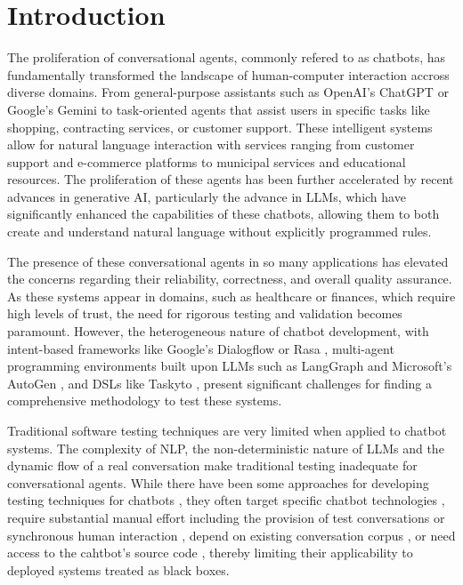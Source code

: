 
\chapter{Introduction}\label{chapter:introduction}


The proliferation of conversational agents, commonly refered to as chatbots, has fundamentally transformed the landscape of human-computer interaction accross diverse domains.
From general-purpose assistants such as OpenAI's ChatGPT \autocite{ChatGPT} or Google's Gemini \autocite{GoogleGemini}
to task-oriented agents that assist users in specific tasks like shopping, contracting services, or customer support.
These intelligent systems allow for natural language interaction with services ranging from customer support and e-commerce platforms to municipal services and educational resources.
The proliferation of these agents has been further accelerated by recent advances in generative \ac{AI},
particularly the advance in \acp{LLM},
which have significantly enhanced the capabilities of these chatbots, allowing them to both create and understand natural language without explicitly programmed rules.

The presence of these conversational agents in so many applications has elevated the concerns regarding their reliability, correctness, and overall quality assurance.
As these systems appear in domains, such as healthcare or finances, which require high levels of trust, the need for rigorous testing and validation becomes paramount.
However, the heterogeneous nature of chatbot development,
with intent-based frameworks like Google's Dialogflow \autocite{Dialogflow} or Rasa \autocite{Rasa2020},
multi-agent programming environments built upon LLMs such as LangGraph \autocite{LangGraph} and Microsoft's AutoGen \autocite{AutoGen},
and \acp{DSL} like Taskyto \autocite{sanchezcuadradoAutomatingDevelopmentTaskoriented2024},
present significant challenges for finding a comprehensive methodology to test these systems.

Traditional software testing techniques are very limited when applied to chatbot systems.
The complexity of \ac{NLP}, the non-deterministic nature of \acp{LLM} and the dynamic flow of a real conversation make traditional testing inadequate for conversational agents.
While there have been some approaches for developing testing techniques for chatbots \cite{cuadradoIntegratingStaticQuality2024, canizaresMeasuringClusteringHeterogeneous2024},
they often target specific chatbot technologies \autocite{RasaTest2025},
require substantial manual effort including the provision of test conversations \autocite{CyaraBotium, RasaTest2025}
or synchronous human interaction \autocite{renEvaluationTechniquesChatbot2019},
depend on existing conversation corpus \autocite{vasconcelosBottesterTestingConversational2017},
or need access to the cahtbot's source code \autocite{canizaresCoveragebasedStrategiesAutomated2024, gomez-abajoMutationTestingTaskOriented2024, urricoMutaBotMutationTesting2024},
thereby limiting their applicability to deployed systems treated as black boxes.

